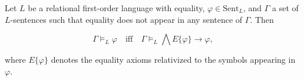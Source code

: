 Let $L$ be a relational first-order language with equality, $\varphi \in \text{Sent}_{L}$, and $\Gamma$ a set of $L$-sentences such that equality does not appear in any sentence of $\Gamma$. Then

$$\Gamma \models_{L} \varphi \quad \text{iff} \quad \Gamma \models_{L} \bigwedge E\{\varphi\} \rightarrow \varphi,$$

where $E\{\varphi\}$ denotes the equality axioms relativized to the symbols appearing in $\varphi$.
